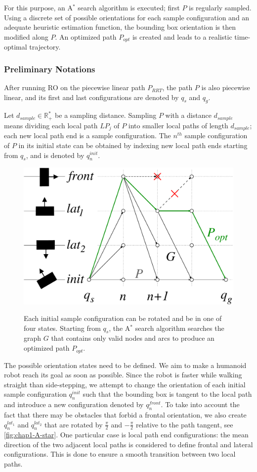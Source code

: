 For this purpose, an A$^{*}$ search algorithm is executed; first $P$ is
regularly sampled. Using a discrete set of possible orientations for
each sample configuration and an adequate heuristic estimation
function, the bounding box orientation is then modified along $P$. An
optimized path $P_{opt}$ is created and leads to a realistic
time-optimal trajectory.

\subsubsection{Preliminary Notations}
After running RO on the piecewise linear path $P_{RRT}$, the
path $P$ is also piecewise linear, and its first and last
configurations are denoted by $q_s$ and $q_g$.

Let $d_{sample} \in \mathbb{R}_+^*$ be a sampling distance. Sampling
$P$ with a distance $d_{sample}$ means dividing each local path $LP_j$
of $P$ into smaller local paths of length $d_{sample}$; each new local
path end is a sample configuration. The $n^{th}$ sample configuration
of $P$ in its initial state can be obtained by indexing new local path
ends starting from $q_s$, and is denoted by $q_n^{init}$.

\begin{figure}
  \centering
      {\includegraphics[width = 0.75\linewidth]
        {src/chap1-path-optimization/A-star.pdf}}
      \caption{Each initial sample configuration can be rotated and be
        in one of four states. Starting from $q_s$, the A$^{*}$ search
        algorithm searches the graph $G$ that contains only valid
        nodes and arcs to produce an optimized path $P_{opt}$.}
      \label{fig:chap1-A-star}
\end{figure}

The possible orientation states need to be defined. We aim to make a
humanoid robot reach its goal as soon as possible. Since the robot is
faster while walking straight than side-stepping, we attempt to change
the orientation of each initial sample configuration $q_n^{init}$ such
that the bounding box is tangent to the local path and introduce a new
configuration denoted by $q_n^{front}$. To take into account the fact
that there may be obstacles that forbid a frontal orientation, we also
create $q_n^{lat_1}$ and $q_n^{lat_2}$ that are rotated by
$\frac{\pi}{2}$ and $-\frac{\pi}{2}$ relative to the path tangent, see
\autoref{fig:chap1-A-star}. One particular case is local path end
configurations: the mean direction of the two adjacent local paths is
considered to define frontal and lateral configurations. This is done
to ensure a smooth transition between two local paths.

